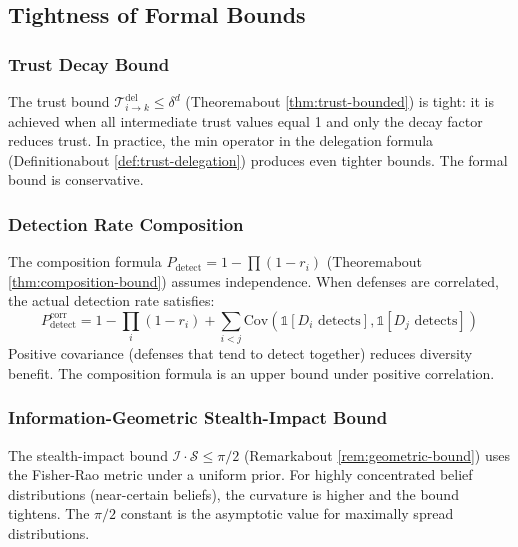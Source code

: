 \documentclass[
]{article}
\begin{document}
\subsection{Tightness of Formal Bounds}\label{sec:bound-tightness}

\subsubsection{Trust Decay Bound}\label{trust-decay-bound}

The trust bound \(\mathcal{T}_{i \to k}^{\text{del}} \leq \delta^d\)
(Theoremabout \ref{thm:trust-bounded}) is tight: it is
achieved when all intermediate trust values equal 1 and only the decay
factor reduces trust. In practice, the min operator in the delegation
formula (Definitionabout \ref{def:trust-delegation}) produces
even tighter bounds. The formal bound is conservative.

\subsubsection{Detection Rate
Composition}\label{detection-rate-composition}

The composition formula \(P_{\text{detect}} = 1 - \prod(1-r_i)\)
(Theoremabout \ref{thm:composition-bound}) assumes
independence. When defenses are correlated, the actual detection rate
satisfies: \begin{equation}
\label{eq:corr-composition}
P_{\text{detect}}^{\text{corr}} = 1 - \prod_i (1-r_i) + \sum_{i < j} \text{Cov}(\mathbb{1}[D_i \text{ detects}], \mathbb{1}[D_j \text{ detects}])
\end{equation} Positive covariance (defenses that tend to detect
together) reduces diversity benefit. The composition formula is an upper
bound under positive correlation.

\subsubsection{Information-Geometric Stealth-Impact
Bound}\label{information-geometric-stealth-impact-bound}

The stealth-impact bound \(\mathcal{I} \cdot \mathcal{S} \leq \pi/2\)
(Remarkabout \ref{rem:geometric-bound}) uses the Fisher-Rao
metric under a uniform prior. For highly concentrated belief
distributions (near-certain beliefs), the curvature is higher and the
bound tightens. The \(\pi/2\) constant is the asymptotic value for
maximally spread distributions.
\end{document}
